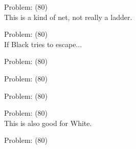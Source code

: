 \documentclass[11pt]{article}
\begin{document}
\begin{minipage}[t]{0.5\textwidth}
  {\centering
  
  Problem: (80)\\
  This is a kind of net, not really a ladder.\\
  }
\end{minipage}
\begin{minipage}[t]{0.5\textwidth}
  {\centering
  
  Problem: (80)\\
  If Black tries to escape...\\
  }
\end{minipage}
\begin{minipage}[t]{0.5\textwidth}
  {\centering
  
  Problem: (80)\\
  
  }
\end{minipage}
\begin{minipage}[t]{0.5\textwidth}
  {\centering
  
  Problem: (80)\\
  
  }
\end{minipage}
\begin{minipage}[t]{0.5\textwidth}
  {\centering
  
  Problem: (80)\\
  
  }
\end{minipage}
\begin{minipage}[t]{0.5\textwidth}
  {\centering
  
  Problem: (80)\\
  This is also good for White.\\
  }
\end{minipage}
\begin{minipage}[t]{0.5\textwidth}
  {\centering
  
  Problem: (80)\\
  
  }
\end{minipage}
\end{document}
